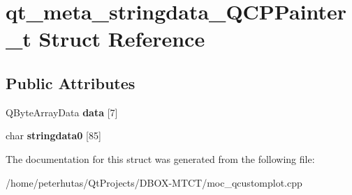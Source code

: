 \hypertarget{structqt__meta__stringdata___q_c_p_painter__t}{}\section{qt\+\_\+meta\+\_\+stringdata\+\_\+\+Q\+C\+P\+Painter\+\_\+t Struct Reference}
\label{structqt__meta__stringdata___q_c_p_painter__t}
\subsection*{Public Attributes}
\begin{DoxyCompactItemize}
\item 
\mbox{\label{structqt__meta__stringdata___q_c_p_painter__t_ad207c5d12c2c25b489d92c783a387865}} 
Q\+Byte\+Array\+Data {\bfseries data} \mbox{[}7\mbox{]}
\item 
\mbox{\label{structqt__meta__stringdata___q_c_p_painter__t_a5a729fecff22f5c3258902008085a51f}} 
char {\bfseries stringdata0} \mbox{[}85\mbox{]}
\end{DoxyCompactItemize}


The documentation for this struct was generated from the following file\+:\begin{DoxyCompactItemize}
\item 
/home/peterhutas/\+Qt\+Projects/\+D\+B\+O\+X-\/\+M\+T\+C\+T/moc\+\_\+qcustomplot.\+cpp\end{DoxyCompactItemize}
